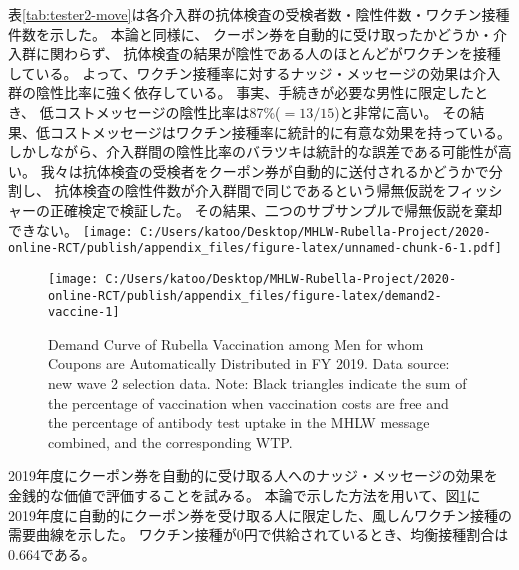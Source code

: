 \documentclass[
  11pt,
  a4paper,
]{article}
\begin{document}
表\ref{tab:tester2-move}は各介入群の抗体検査の受検者数・陰性件数・ワクチン接種件数を示した。
本論と同様に、
クーポン券を自動的に受け取ったかどうか・介入群に関わらず、
抗体検査の結果が陰性である人のほとんどがワクチンを接種している。
よって、ワクチン接種率に対するナッジ・メッセージの効果は介入群の陰性比率に強く依存している。
事実、手続きが必要な男性に限定したとき、
低コストメッセージの陰性比率は87\%(\(=13/15\))と非常に高い。
その結果、低コストメッセージはワクチン接種率に統計的に有意な効果を持っている。
しかしながら、介入群間の陰性比率のバラツキは統計的な誤差である可能性が高い。
我々は抗体検査の受検者をクーポン券が自動的に送付されるかどうかで分割し、
抗体検査の陰性件数が介入群間で同じであるという帰無仮説をフィッシャーの正確検定で検証した。
その結果、二つのサブサンプルで帰無仮説を棄却できない。
\texttt{[image: C:/Users/katoo/Desktop/MHLW-Rubella-Project/2020-online-RCT/publish/appendix\_files/figure-latex/unnamed-chunk-6-1.pdf]}

\begin{figure}[t]
\texttt{[image: C:/Users/katoo/Desktop/MHLW-Rubella-Project/2020-online-RCT/publish/appendix\_files/figure-latex/demand2-vaccine-1]} \caption{Demand Curve of Rubella Vaccination among Men for whom Coupons are Automatically Distributed in FY 2019. Data source: new wave 2 selection data. Note: Black triangles indicate the sum of the percentage of vaccination when vaccination costs are free and the percentage of antibody test uptake in the MHLW message combined, and the corresponding WTP.}\label{fig:demand2-vaccine}
\end{figure}

2019年度にクーポン券を自動的に受け取る人へのナッジ・メッセージの効果を
金銭的な価値で評価することを試みる。
本論で示した方法を用いて、図\ref{fig:demand2-vaccine}に
2019年度に自動的にクーポン券を受け取る人に限定した、風しんワクチン接種の需要曲線を示した。
ワクチン接種が0円で供給されているとき、均衡接種割合は0.664である。
\end{document}

